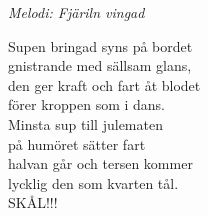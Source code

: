 {\footnotesize\textit{Melodi: Fjäriln vingad}}\par
\vspace{10pt}
Supen bringad syns på bordet\\
gnistrande med sällsam glans,\\
den ger kraft och fart åt blodet\\
förer kroppen som i dans.\\
Minsta sup till julematen\\
på humöret sätter fart\\
halvan går och tersen kommer\\
lycklig den som kvarten tål.\\
SKÅL!!!

